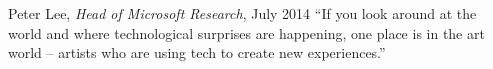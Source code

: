 
\vspace*{7cm}
\begin{chapquote}{Peter Lee, \textit{Head of Microsoft Research}, July 2014}
``If you look around at the world and where technological surprises are happening, one place is in the art world -- artists who are using tech to create new experiences.''
\end{chapquote}


